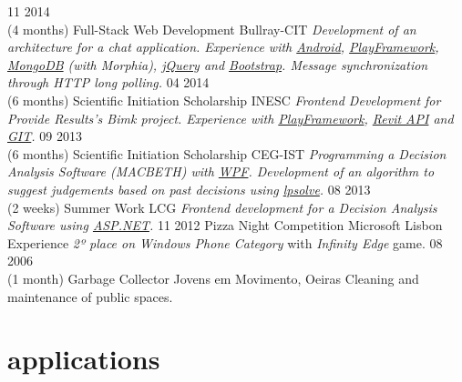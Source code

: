 \documentclass[]{friggeri-cv}
\begin{document}
\begin{entrylist}
  \entry
    {11 2014\\(4 months)}
    {Full-Stack Web Development}
    {Bullray-CIT}
    {\emph{Development of an architecture for a chat application. Experience with \underline{Android}, \underline{PlayFramework}, \underline{MongoDB} (with Morphia), \underline{jQuery} and \underline{Bootstrap}. Message synchronization through HTTP long polling.}}
  \entry
    {04 2014\\(6 months)}
    {Scientific Initiation Scholarship}
    {INESC}
    {\emph{Frontend Development for Provide Results's Bimk project. Experience with \underline{PlayFramework}, \underline{Revit API} and \underline{GIT}.}}
  \entry
    {09 2013\\(6 months)}
    {Scientific Initiation Scholarship}
    {CEG-IST}
    {\emph{Programming a Decision Analysis Software (MACBETH) with \underline{WPF}. Development of an algorithm to suggest judgements based on past decisions using \underline{lpsolve}.}}
  \entry
    {08 2013\\(2 weeks)}
    {Summer Work}
    {LCG}
    {\emph{Frontend development for a Decision Analysis Software using \underline{ASP.NET}. }}
  \entry
    {11 2012}
    {Pizza Night Competition}
    {Microsoft Lisbon Experience}
    {\emph{2º place on Windows Phone Category} with \emph{Infinity Edge} game.}
  \entry
    {08 2006\\(1 month)}
    {Garbage Collector}
    {Jovens em Movimento, Oeiras}
    {Cleaning and maintenance of public spaces.}


\end{entrylist}

\section{applications}
\end{document}
